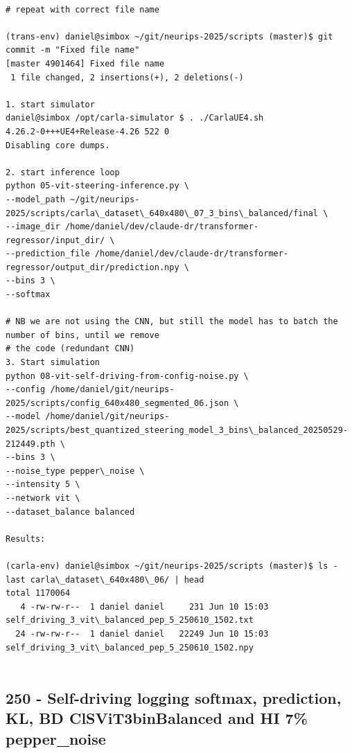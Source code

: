\begin{verbatim}

# repeat with correct file name

(trans-env) daniel@simbox ~/git/neurips-2025/scripts (master)$ git commit -m "Fixed file name"
[master 4901464] Fixed file name
 1 file changed, 2 insertions(+), 2 deletions(-)
 
1. start simulator
daniel@simbox /opt/carla-simulator $ . ./CarlaUE4.sh 
4.26.2-0+++UE4+Release-4.26 522 0
Disabling core dumps.

2. start inference loop
python 05-vit-steering-inference.py \
--model_path ~/git/neurips-2025/scripts/carla\_dataset\_640x480\_07_3_bins\_balanced/final \
--image_dir /home/daniel/dev/claude-dr/transformer-regressor/input_dir/ \
--prediction_file /home/daniel/dev/claude-dr/transformer-regressor/output_dir/prediction.npy \
--bins 3 \
--softmax

# NB we are not using the CNN, but still the model has to batch the number of bins, until we remove
# the code (redundant CNN)
3. Start simulation
python 08-vit-self-driving-from-config-noise.py \
--config /home/daniel/git/neurips-2025/scripts/config_640x480_segmented_06.json \
--model /home/daniel/git/neurips-2025/scripts/best_quantized_steering_model_3_bins\_balanced_20250529-212449.pth \
--bins 3 \
--noise_type pepper\_noise \
--intensity 5 \
--network vit \
--dataset_balance balanced

Results:

(carla-env) daniel@simbox ~/git/neurips-2025/scripts (master)$ ls -last carla\_dataset\_640x480\_06/ | head
total 1170064
   4 -rw-rw-r--  1 daniel daniel     231 Jun 10 15:03 self_driving_3_vit\_balanced_pep_5_250610_1502.txt
  24 -rw-rw-r--  1 daniel daniel   22249 Jun 10 15:03 self_driving_3_vit\_balanced_pep_5_250610_1502.npy


\end{verbatim}

\subsection{250 - Self-driving logging softmax, prediction, KL, BD ClSViT3binBalanced and HI 7\% pepper\_noise}
\label{app_res:250}

